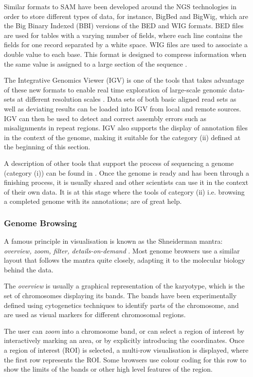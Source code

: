 Similar formats to SAM have been developed around the NGS technologies in order to store different types of data, for instance, BigBed and BigWig, which are the Big Binary Indexed (BBI) versions of the BED and WIG formats. BED files are used for tables with a varying number of fields, where each line contains the fields for one record separated by a white space. WIG files are used to associate a double value to each base. This format is designed to compress information when the same value is assigned to a large section of the sequence \cite{KEN2010}.

The Integrative Genomics Viewer (IGV) is one of the tools that takes advantage of these new formats to enable real time exploration of large-scale genomic data-sets at different resolution scales \cite{ROB2011}. Data sets of both basic aligned read sets as well as deviating results can be loaded into IGV from local and remote sources. IGV can then be used to detect and correct assembly errors such as misalignments in repeat regions. IGV also supports the display of annotation files in the context of the genome, making it suitable for the category (ii) defined at the beginning of this section.

A description of other tools that support the process of sequencing a genome (category (i)) can be found in \cite{NIE2010}. Once the genome is ready and has been through a finishing process, it is usually shared and other scientists can use it in the context of their own data. It is at this stage where the tools of category (ii) i.e. browsing a completed genome with its annotations; are of great help.

\subsubsection{Genome Browsing}
A famous principle in visualisation is known as the Shneiderman mantra: \emph{overview, zoom, filter, details-on-demand} \cite{SHN1996}. Most genome browsers use a similar layout that follows the mantra quite closely, adapting it to the molecular biology behind the data.

The \emph{overview} is usually a graphical representation of the karyotype, which is the set of chromosomes displaying its bands. The bands have been experimentally defined using cytogenetics techniques to identify parts of the chromosome, and are used as visual markers for different chromosomal regions.

The user can \emph{zoom} into a chromosome band, or can select a region of interest by interactively marking an area, or by explicitly introducing the coordinates. Once a region of interest (ROI) is selected, a multi-row visualisation is displayed, where the first row represents the ROI. Some browsers use colour coding for this row to show the limits of the bands or other high level features of the region.

